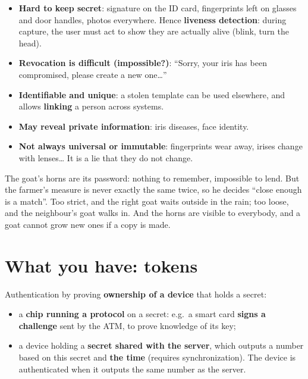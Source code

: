 \begin{warnbox}[title=Problems with biometrics]
\begin{itemize}
  \item \textbf{Hard to keep secret}: signature on the ID card, fingerprints left on glasses and
        door handles, photos everywhere. Hence \textbf{liveness detection}: during capture, the
        user must act to show they are actually alive (blink, turn the head).
  \item \textbf{Revocation is difficult (impossible?)}: ``Sorry, your iris has been compromised,
        please create a new one\ldots''
  \item \textbf{Identifiable and unique}: a stolen template can be used elsewhere, and allows
        \textbf{linking} a person across systems.
  \item \textbf{May reveal private information}: iris diseases, face identity.
  \item \textbf{Not always universal or immutable}: fingerprints wear away, irises change with
        lenses\ldots{} It is a lie that they do not change.
\end{itemize}
\end{warnbox}

\begin{goatbox}
The goat's horns are its password: nothing to remember, impossible to lend. But the farmer's
measure is never exactly the same twice, so he decides ``close enough is a match''. Too strict, and
the right goat waits outside in the rain; too loose, and the neighbour's goat walks in. And the
horns are visible to everybody, and a goat cannot grow new ones if a copy is made.
\end{goatbox}

\section{What you have: tokens}

\begin{defnbox}[title=Tokens]
Authentication by proving \textbf{ownership of a device} that holds a secret:
\begin{itemize}
  \item a \textbf{chip running a protocol} on a secret: e.g.\ a smart card \textbf{signs a
        challenge} sent by the ATM, to prove knowledge of its key;
  \item a device holding a \textbf{secret shared with the server}, which outputs a number based on
        this secret and \textbf{the time} (requires synchronization). The device is authenticated
        when it outputs the same number as the server.
\end{itemize}
\end{defnbox}

